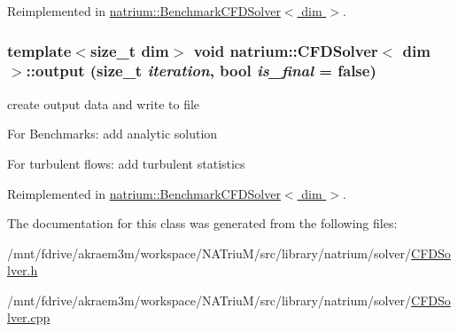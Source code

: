 Reimplemented in \hyperlink{classnatrium_1_1BenchmarkCFDSolver_a7883dcfd4469ae65ae62cad09ae5d160}{natrium::BenchmarkCFDSolver$<$ dim $>$}.\hypertarget{classnatrium_1_1CFDSolver_abd1bdd31bac002516e4184f50bf8a547}{
\subsubsection[{output}]{\setlength{\rightskip}{0pt plus 5cm}template$<$size\_\-t dim$>$ void {\bf natrium::CFDSolver}$<$ dim $>$::output (size\_\-t {\em iteration}, \/  bool {\em is\_\-final} = {\ttfamily false})}}
\label{classnatrium_1_1CFDSolver_abd1bdd31bac002516e4184f50bf8a547}


create output data and write to file 

For Benchmarks: add analytic solution

For turbulent flows: add turbulent statistics 

Reimplemented in \hyperlink{classnatrium_1_1BenchmarkCFDSolver_a9d63cc1e2fe66301533713d4f1ce43a6}{natrium::BenchmarkCFDSolver$<$ dim $>$}.

The documentation for this class was generated from the following files:\begin{DoxyCompactItemize}
\item 
/mnt/fdrive/akraem3m/workspace/NATriuM/src/library/natrium/solver/\hyperlink{CFDSolver_8h}{CFDSolver.h}\item 
/mnt/fdrive/akraem3m/workspace/NATriuM/src/library/natrium/solver/\hyperlink{CFDSolver_8cpp}{CFDSolver.cpp}\end{DoxyCompactItemize}
